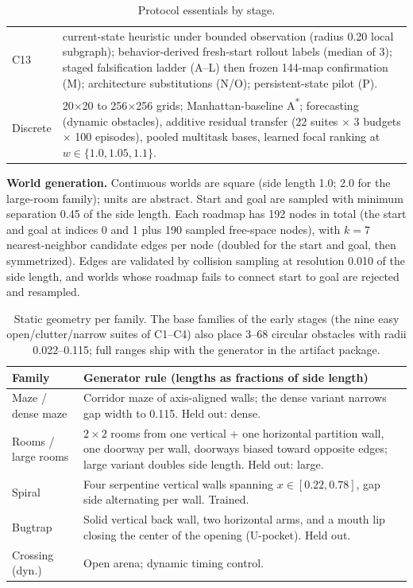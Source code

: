 \documentclass[letterpaper]{article} %
\newcommand{\stage}[1]{\textsc{#1}}
\begin{document}
\begin{table}[t]
\begin{tabular}{@{}lp{14.2cm}@{}}
\stage{C13} & current-state heuristic under bounded observation (radius 0.20 local subgraph); behavior-derived fresh-start rollout labels (median of 3); staged falsification ladder (\stage{A}--\stage{L}) then frozen 144-map confirmation (\stage{M}); architecture substitutions (\stage{N}/\stage{O}); persistent-state pilot (\stage{P}). \\
Discrete & 20$\times$20 to 256$\times$256 grids; Manhattan-baseline A\textsuperscript{*}; forecasting (dynamic obstacles), additive residual transfer (22 suites $\times$ 3 budgets $\times$ 100 episodes), pooled multitask bases, learned focal ranking at $w\in\{1.0,1.05,1.1\}$. \\
\bottomrule
\end{tabular}
\caption{Protocol essentials by stage.}
\label{tab:protocols}
\end{table}

\textbf{World generation.} Continuous worlds are square (side length 1.0; 2.0 for the large-room family); units are abstract. Start and goal are sampled with minimum separation 0.45 of the side length. Each roadmap has 192 nodes in total (the start and goal at indices 0 and 1 plus 190 sampled free-space nodes), with $k{=}7$ nearest-neighbor candidate edges per node (doubled for the start and goal, then symmetrized). Edges are validated by collision sampling at resolution 0.010 of the side length, and worlds whose roadmap fails to connect start to goal are rejected and resampled.

\begin{table}[t]
\centering
\small
\setlength{\tabcolsep}{2.5pt}
\begin{tabular}{@{}lp{5.6cm}@{}}
\toprule
Family & Generator rule (lengths as fractions of side length) \\
\midrule
Maze / dense maze & Corridor maze of axis-aligned walls; the dense variant narrows gap width to 0.115. Held out: dense. \\
Rooms / large rooms & $2{\times}2$ rooms from one vertical + one horizontal partition wall, one doorway per wall, doorways biased toward opposite edges; large variant doubles side length. Held out: large. \\
Spiral & Four serpentine vertical walls spanning $x \in [0.22, 0.78]$, gap side alternating per wall. Trained. \\
Bugtrap & Solid vertical back wall, two horizontal arms, and a mouth lip closing the center of the opening (U-pocket). Held out. \\
Crossing (dyn.) & Open arena; dynamic timing control. \\
\bottomrule
\end{tabular}
\caption{Static geometry per family. The base families of the early stages (the nine easy open/clutter/narrow suites of \stage{C1}--\stage{C4}) also place 3--68 circular obstacles with radii 0.022--0.115; full ranges ship with the generator in the artifact package.}
\label{tab:envspec}
\end{table}
\end{document}
